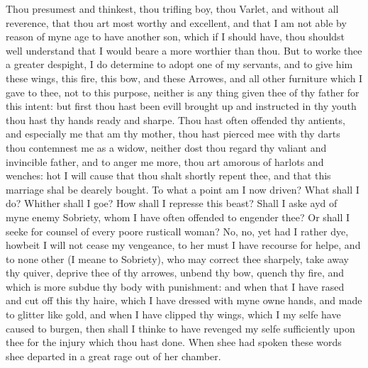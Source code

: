 Thou presumest and thinkest, thou trifling boy, thou Varlet, and without all
reverence, that thou art most worthy and excellent, and that I am not able by
reason of myne age to have another son, which if I should have, thou shouldst
well understand that I would beare a more worthier than thou. But to worke thee
a greater despight, I do determine to adopt one of my servants, and to give him
these wings, this fire, this bow, and these Arrowes, and all other furniture
which I gave to thee, not to this purpose, neither is any thing given thee of
thy father for this intent: but first thou hast been evill brought up and
instructed in thy youth thou hast thy hands ready and sharpe. Thou hast often
offended thy antients, and especially me that am thy mother, thou hast pierced
mee with thy darts thou contemnest me as a widow, neither dost thou regard
thy valiant and invincible father, and to anger me more, thou art amorous of
harlots and wenches: hot I will cause that thou shalt shortly repent thee, and
that this marriage shal be dearely bought. To what a point am I now driven?
What shall I do? Whither shall I goe? How shall I represse this beast? Shall I
aske ayd of myne enemy Sobriety, whom I have often offended to engender thee?
Or shall I seeke for counsel of every poore rusticall woman? No, no, yet had I
rather dye, howbeit I will not cease my vengeance, to her must I have recourse
for helpe, and to none other (I meane to Sobriety), who may correct thee
sharpely, take away thy quiver, deprive thee of thy arrowes, unbend thy bow,
quench thy fire, and which is more subdue thy body with punishment: and when
that I have rased and cut off this thy haire, which I have dressed with myne
owne hands, and made to glitter like gold, and when I have clipped thy wings,
which I my selfe have caused to burgen, then shall I thinke to have revenged my
selfe sufficiently upon thee for the injury which thou hast done. When shee had
spoken these words shee departed in a great rage out of her chamber.


